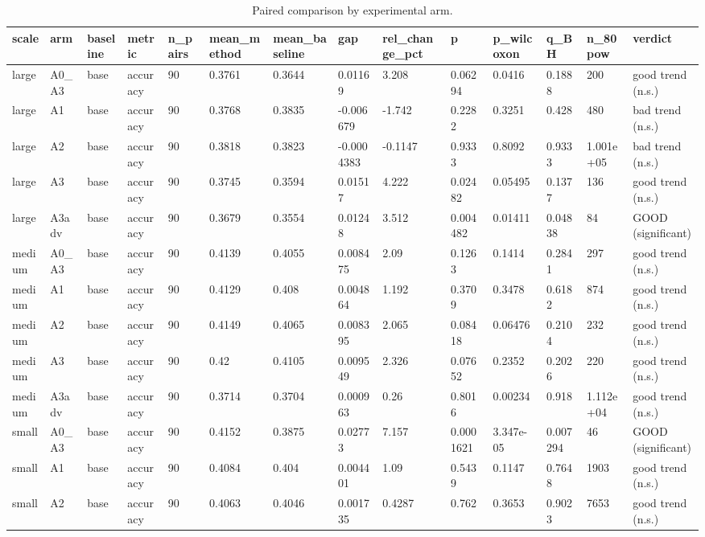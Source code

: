 \begin{table}[t]\centering\footnotesize
\caption{Paired comparison by experimental arm.}\label{tab:table8_paired_by_arm}
\begin{tabular}{llllllllllllll}
\toprule
scale & arm & baseline & metric & n\_pairs & mean\_method & mean\_baseline & gap & rel\_change\_pct & p & p\_wilcoxon & q\_BH & n\_80pow & verdict \\
\midrule
large & A0\_A3 & base & accuracy & 90 & 0.3761 & 0.3644 & 0.01169 & 3.208 & 0.06294 & 0.0416 & 0.1888 & 200 & good trend (n.s.) \\
large & A1 & base & accuracy & 90 & 0.3768 & 0.3835 & -0.006679 & -1.742 & 0.2282 & 0.3251 & 0.428 & 480 & bad trend (n.s.) \\
large & A2 & base & accuracy & 90 & 0.3818 & 0.3823 & -0.0004383 & -0.1147 & 0.9333 & 0.8092 & 0.9333 & 1.001e+05 & bad trend (n.s.) \\
large & A3 & base & accuracy & 90 & 0.3745 & 0.3594 & 0.01517 & 4.222 & 0.02482 & 0.05495 & 0.1377 & 136 & good trend (n.s.) \\
large & A3adv & base & accuracy & 90 & 0.3679 & 0.3554 & 0.01248 & 3.512 & 0.004482 & 0.01411 & 0.04838 & 84 & GOOD (significant) \\
medium & A0\_A3 & base & accuracy & 90 & 0.4139 & 0.4055 & 0.008475 & 2.09 & 0.1263 & 0.1414 & 0.2841 & 297 & good trend (n.s.) \\
medium & A1 & base & accuracy & 90 & 0.4129 & 0.408 & 0.004864 & 1.192 & 0.3709 & 0.3478 & 0.6182 & 874 & good trend (n.s.) \\
medium & A2 & base & accuracy & 90 & 0.4149 & 0.4065 & 0.008395 & 2.065 & 0.08418 & 0.06476 & 0.2104 & 232 & good trend (n.s.) \\
medium & A3 & base & accuracy & 90 & 0.42 & 0.4105 & 0.009549 & 2.326 & 0.07652 & 0.2352 & 0.2026 & 220 & good trend (n.s.) \\
medium & A3adv & base & accuracy & 90 & 0.3714 & 0.3704 & 0.000963 & 0.26 & 0.8016 & 0.00234 & 0.918 & 1.112e+04 & good trend (n.s.) \\
small & A0\_A3 & base & accuracy & 90 & 0.4152 & 0.3875 & 0.02773 & 7.157 & 0.0001621 & 3.347e-05 & 0.007294 & 46 & GOOD (significant) \\
small & A1 & base & accuracy & 90 & 0.4084 & 0.404 & 0.004401 & 1.09 & 0.5439 & 0.1147 & 0.7648 & 1903 & good trend (n.s.) \\
small & A2 & base & accuracy & 90 & 0.4063 & 0.4046 & 0.001735 & 0.4287 & 0.762 & 0.3653 & 0.9023 & 7653 & good trend (n.s.) \\

\end{tabular}
\end{table}
